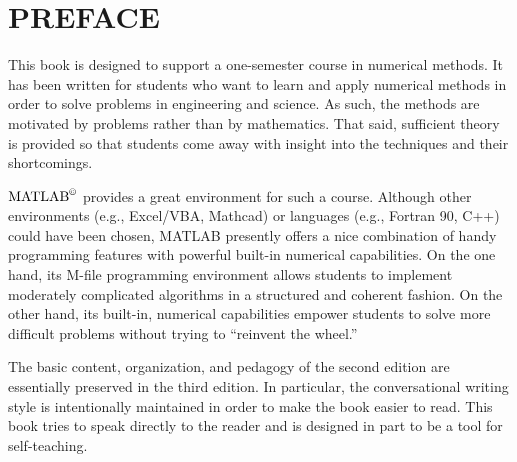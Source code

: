 \documentclass[../main.tex]{subfiles}
\begin{document}
\chapter*{PREFACE}
\label{cha:cha_P_1}

This book is designed to support a one-semester course in numerical methods. It has been
written for students who want to learn and apply numerical methods in order to solve problems in engineering and science. As such, the methods are motivated by problems rather
than by mathematics. That said, sufficient theory is provided so that students come away
with insight into the techniques and their shortcomings.


$\text{MATLAB}^\copyright$  provides a great environment for such a course. Although other environments (e.g., Excel/VBA, Mathcad) or languages (e.g., Fortran 90, C++) could have
been chosen, MATLAB presently offers a nice combination of handy programming features with powerful built-in numerical capabilities. On the one hand, its M-file programming environment allows students to implement moderately complicated algorithms in a
structured and coherent fashion. On the other hand, its built-in, numerical capabilities
empower students to solve more difficult problems without trying to “reinvent the wheel.”


The basic content, organization, and pedagogy of the second edition are essentially
preserved in the third edition. In particular, the conversational writing style is intentionally
maintained in order to make the book easier to read. This book tries to speak directly to the
reader and is designed in part to be a tool for self-teaching.
\end{document}
